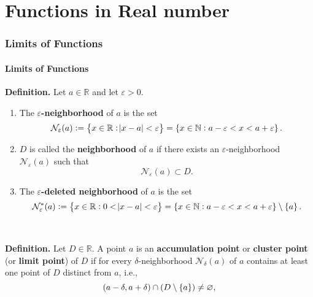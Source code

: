 \documentclass[12pt,a4paper]{article}
\begin{document}
\newpage
\part{Functions in Real number}

\section{Limits of Functions}

\subsection{Limits of Functions}
\begin{tcolorbox}[colback=white]
	\textbf{Definition.} Let $a\in\mathbb{R}$ and let $\varepsilon>0$. \begin{enumerate}
		\item The \textbf{$\varepsilon$-neighborhood} of $a$ is the set \[
		\mathcal{N}_\varepsilon(a) := \set{x\in\mathbb{R}:\abs{x-a}<\varepsilon}=\set{x\in\mathbb{N}:a-\varepsilon<x<a+\varepsilon}.
		\]
		\item $D$ is called the \textbf{neighborhood} of $a$ if there exists an $\varepsilon$-neighborhood $\mathcal{N}_\varepsilon(a)$ such that \[
		\mathcal{N}_\varepsilon(a)\subset D.
		\]
		\item The \textbf{$\varepsilon$-deleted neighborhood} of $a$ is the set \[
		\mathcal{N}_\varepsilon^*(a) := \set{x\in\mathbb{R}:0<\abs{x-a}<\varepsilon}=\set{x\in\mathbb{N}:a-\varepsilon<x<a+\varepsilon}\setminus\set{a}.
		\]
	\end{enumerate}
\end{tcolorbox}
\
\begin{tcolorbox}[colback=white]
	\textbf{Definition.} Let $D\in\mathbb{R}$. A point $a$ is an \textbf{accumulation point} or \textbf{cluster point} (or \textbf{limit point}) of $D$ if for every $\delta$-neighborhood $\mathcal{N}_\delta(a)$ of $a$ contains at least one point of $D$ distinct from $a$, i.e., \[
	(a-\delta,a+\delta)\cap(D\setminus\set{a})\neq\varnothing,
	\]
\end{tcolorbox}\
\\
\end{document}
